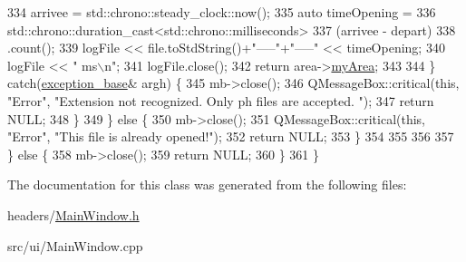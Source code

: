 \begin{DoxyCode}
334                 arrivee = std::chrono::steady\_clock::now();
335                 \textcolor{keyword}{auto} timeOpening =
336                     std::chrono::duration\_cast<std::chrono::milliseconds>
337                         (arrivee - depart)
338                     .count();
339                 logFile << file.toStdString()+\textcolor{stringliteral}{"-----"}+\textcolor{stringliteral}{"-----"} << timeOpening;
340                 logFile << \textcolor{stringliteral}{" ms\(\backslash\)n"};
341                 logFile.close();
342                 \textcolor{keywordflow}{return} area->\hyperlink{classArea_a3c00ea9bb14425efbee3fcf80410c4cf}{myArea};
343 
344             \} \textcolor{keywordflow}{catch}(\hyperlink{structexception__base}{exception\_base}& argh) \{
345                 mb->close();
346                 QMessageBox::critical(\textcolor{keyword}{this}, \textcolor{stringliteral}{"Error"}, \textcolor{stringliteral}{"Extension not recognized. Only ph files are accepted.
      "});
347                 \textcolor{keywordflow}{return} NULL;
348             \}
349         \} \textcolor{keywordflow}{else} \{
350             mb->close();
351             QMessageBox::critical(\textcolor{keyword}{this}, \textcolor{stringliteral}{"Error"}, \textcolor{stringliteral}{"This file is already opened!"});
352             \textcolor{keywordflow}{return} NULL;
353         \}
354 
355 
356 
357     \} \textcolor{keywordflow}{else} \{
358         mb->close();
359         \textcolor{keywordflow}{return} NULL;
360     \}
361 \}
\end{DoxyCode}


The documentation for this class was generated from the following files\+:\begin{DoxyCompactItemize}
\item 
headers/\hyperlink{MainWindow_8h}{Main\+Window.\+h}\item 
src/ui/Main\+Window.\+cpp\end{DoxyCompactItemize}
